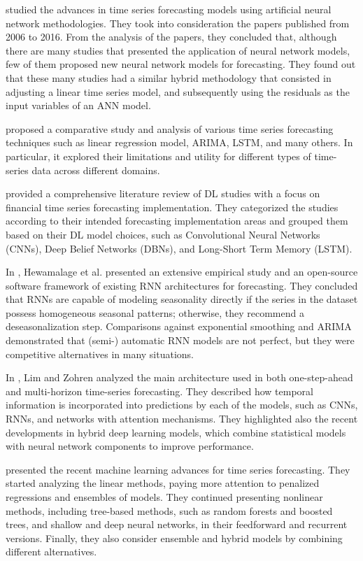 \cite{TEALAB2018334} studied the advances in time series forecasting models using artificial neural network methodologies.
They took into consideration the papers published from 2006 to 2016.
From the analysis of the papers, they concluded that, although there are many studies that presented the application of neural network models, few of them proposed new neural network models for forecasting.
They found out that these many studies had a similar hybrid methodology that consisted in adjusting a linear time series model, and subsequently using the residuals as the input variables of an ANN model.

\cite{Athiyarath2020} proposed a comparative study and analysis of various time series forecasting techniques such as linear regression model, ARIMA, LSTM, and many others.
In particular, it explored their limitations and utility for different types of time-series data across different domains.

\cite{SEZER2020106181} provided a comprehensive literature review of DL studies with a focus on financial time series forecasting implementation.
They categorized the studies according to their intended forecasting implementation areas and grouped them based on their DL model choices, such as Convolutional Neural Networks (CNNs), Deep Belief Networks (DBNs), and Long-Short Term Memory (LSTM).

In \cite{HEWAMALAGE2021388}, Hewamalage et al. presented an extensive empirical study and an open-source software framework of existing RNN architectures for forecasting.
They concluded that RNNs are capable of modeling seasonality directly if the series in the dataset possess homogeneous seasonal patterns; otherwise, they recommend a deseasonalization step.
Comparisons against exponential smoothing and ARIMA demonstrated that (semi-) automatic RNN models are not perfect, but they were competitive alternatives in many situations.

In \cite{Lim2021}, Lim and Zohren analyzed the main architecture used in both one-step-ahead and multi-horizon time-series forecasting.
They described how temporal information is incorporated into predictions by each of the models, such as CNNs, RNNs, and networks with attention mechanisms.
They highlighted also the recent developments in hybrid deep learning models, which combine statistical models with neural network components to improve performance.

\cite{Masini2023} presented the recent machine learning advances for time series forecasting.
They started analyzing the linear methods, paying more attention to penalized regressions and ensembles of models.
They continued presenting nonlinear methods, including tree-based methods, such as random forests and boosted trees, and shallow and deep neural networks, in their feedforward and recurrent versions.
Finally, they also consider ensemble and hybrid models by combining different alternatives.

